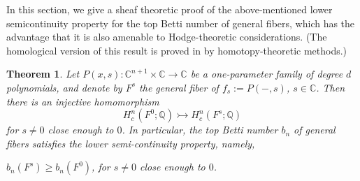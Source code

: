 \documentclass[10pt,a4paper]{amsart}
\newtheorem{theorem}{Theorem}[section]
\numberwithin{equation}{section}  %
\def\be{\begin{equation}}
\def\ee{\end{equation}}
\newcommand{\C}{\mathbb{C}}
\newcommand{\Q}{\mathbb{Q}}
\begin{document}
In this section, we give a sheaf theoretic proof of the above-mentioned lower semicontinuity property for the top Betti number of general fibers, which has the advantage that it is also amenable to Hodge-theoretic considerations. (The homological version of this result is proved in \cite{ST1,T2} by homotopy-theoretic methods.)


\begin{theorem}\label{lsc}
Let $P(x,s):\C^{n+1} \times \C \to \C$ be a one-parameter family of degree $d$ polynomials, %
and denote by $F^s$ the general fiber of $f_s:=P(-,s)$, $s \in \C$. Then there is an injective homomorphism 
\be\label{injl} H^n_c(F^0;\Q)  \rightarrowtail H^n_c(F^s;\Q) \ee
for $s\neq 0$ close enough to $0$. In particular, the top Betti number $b_n$ of general fibers satisfies the lower semi-continuity property, namely,
\begin{center} $b_n(F^s) \geq b_n(F^0)$, for $s \neq 0$ close enough to $0$.\end{center} 
\end{theorem}
\end{document}
